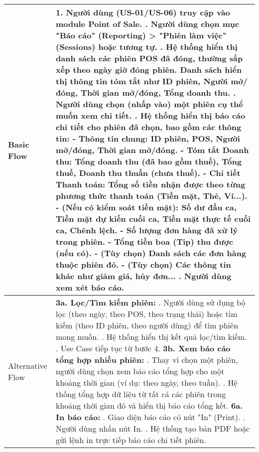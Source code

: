 \begin{longtable}{|m{4cm}|p{11cm}|}
\hline
Basic Flow & 1. Người dùng (US-01/US-06) truy cập vào module Point of Sale. \newline 2. Người dùng chọn mục "Báo cáo" (Reporting) > "Phiên làm việc" (Sessions) hoặc tương tự. \newline 3. Hệ thống hiển thị danh sách các phiên POS đã đóng, thường sắp xếp theo ngày giờ đóng phiên. Danh sách hiển thị thông tin tóm tắt như ID phiên, Người mở/đóng, Thời gian mở/đóng, Tổng doanh thu. \newline 4. Người dùng chọn (nhấp vào) một phiên cụ thể muốn xem chi tiết. \newline 5. Hệ thống hiển thị báo cáo chi tiết cho phiên đã chọn, bao gồm các thông tin: \newline    - Thông tin chung: ID phiên, POS, Người mở/đóng, Thời gian mở/đóng. \newline    - Tóm tắt Doanh thu: Tổng doanh thu (đã bao gồm thuế), Tổng thuế, Doanh thu thuần (chưa thuế). \newline    - Chi tiết Thanh toán: Tổng số tiền nhận được theo từng phương thức thanh toán (Tiền mặt, Thẻ, Ví...). \newline    - (Nếu có kiểm soát tiền mặt): Số dư đầu ca, Tiền mặt dự kiến cuối ca, Tiền mặt thực tế cuối ca, Chênh lệch. \newline    - Số lượng đơn hàng đã xử lý trong phiên. \newline    - Tổng tiền boa (Tip) thu được (nếu có). \newline    - (Tùy chọn) Danh sách các đơn hàng thuộc phiên đó. \newline    - (Tùy chọn) Các thông tin khác như giảm giá, hủy đơn... \newline 6. Người dùng xem xét báo cáo. \\
\hline
Alternative Flow & \textbf{3a. Lọc/Tìm kiếm phiên:} \newline    1. Người dùng sử dụng bộ lọc (theo ngày, theo POS, theo trạng thái) hoặc tìm kiếm (theo ID phiên, theo người dùng) để tìm phiên mong muốn. \newline    2. Hệ thống hiển thị kết quả lọc/tìm kiếm. \newline    3. Use Case tiếp tục từ bước 4. \newline \textbf{3b. Xem báo cáo tổng hợp nhiều phiên:} \newline    1. Thay vì chọn một phiên, người dùng chọn xem báo cáo tổng hợp cho một khoảng thời gian (ví dụ: theo ngày, theo tuần). \newline    2. Hệ thống tổng hợp dữ liệu từ tất cả các phiên trong khoảng thời gian đó và hiển thị báo cáo tổng kết. \newline \textbf{6a. In báo cáo:} \newline    1. Giao diện báo cáo có nút "In" (Print). \newline    2. Người dùng nhấn nút In. \newline    3. Hệ thống tạo bản PDF hoặc gửi lệnh in trực tiếp báo cáo chi tiết phiên. \\

\end{longtable}

